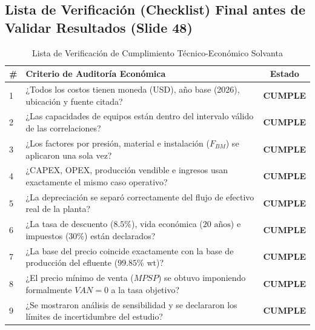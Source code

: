 \documentclass[11pt,letterpaper]{article}
\begin{document}
\subsection{Lista de Verificación (Checklist) Final antes de Validar Resultados (Slide 48)}
\begin{table}[htbp]
    \centering
    \small
    \caption{Lista de Verificación de Cumplimiento Técnico-Económico Solvanta}
    \begin{tabularx}{\textwidth}{l X c}
        \toprule
        \rowcolor{tableheader}
        \textbf{\color{white}\#} & \textbf{\color{white}Criterio de Auditoría Económica} & \textbf{\color{white}Estado} \\
        \midrule
        1 & ¿Todos los costos tienen moneda (USD), año base (2026), ubicación y fuente citada? & \textbf{CUMPLE} \\
        \rowcolor{tablerowgray}
        2 & ¿Las capacidades de equipos están dentro del intervalo válido de las correlaciones? & \textbf{CUMPLE} \\
        3 & ¿Los factores por presión, material e instalación ($F_{BM}$) se aplicaron una sola vez? & \textbf{CUMPLE} \\
        \rowcolor{tablerowgray}
        4 & ¿CAPEX, OPEX, producción vendible e ingresos usan exactamente el mismo caso operativo? & \textbf{CUMPLE} \\
        5 & ¿La depreciación se separó correctamente del flujo de efectivo real de la planta? & \textbf{CUMPLE} \\
        \rowcolor{tablerowgray}
        6 & ¿La tasa de descuento ($8.5\%$), vida económica ($20\text{ años}$) e impuestos ($30\%$) están declarados? & \textbf{CUMPLE} \\
        7 & ¿La base del precio coincide exactamente con la base de producción del efluente ($99.85\%\text{ wt}$)? & \textbf{CUMPLE} \\
        \rowcolor{tablerowgray}
        8 & ¿El precio mínimo de venta ($MPSP$) se obtuvo imponiendo formalmente $VAN = 0$ a la tasa objetivo? & \textbf{CUMPLE} \\
        9 & ¿Se mostraron análisis de sensibilidad y se declararon los límites de incertidumbre del estudio? & \textbf{CUMPLE} \\
        \bottomrule
    \end{tabularx}
\end{table}

\newpage

\end{document}
